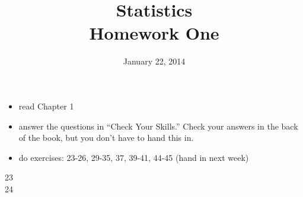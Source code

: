 \documentclass{exam}
\title{Statistics \\ Homework One}
\author{}
\date{January 22, 2014}
\begin{document}
  \maketitle

  \ifprintanswers
  \else
    \begin{itemize}
      \item read Chapter 1 
      \item answer the questions in ``Check Your Skills.''  Check your answers in the back of the book, but you don't
        have to hand this in.
      \item do exercises: 23-26, 29-35, 37, 39-41, 44-45 (hand in next week)
    \end{itemize}
  \fi

  \ifprintanswers
    \begin{description}
      \item[23]

      \item[24]
\end{description}
\end{document}
